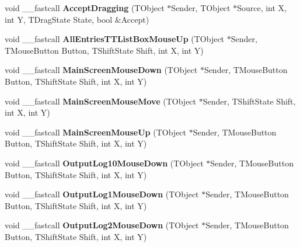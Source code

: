 \begin{DoxyCompactItemize}
void \+\_\+\+\_\+fastcall {\bfseries Accept\+Dragging} (T\+Object $\ast$Sender, T\+Object $\ast$Source, int X, int Y, T\+Drag\+State State, bool \&Accept)
\item 
\mbox{\label{class_t_interface_a189a4b05f27d6b5ec8b9a90ec1a9cc50}} 
void \+\_\+\+\_\+fastcall {\bfseries All\+Entries\+T\+T\+List\+Box\+Mouse\+Up} (T\+Object $\ast$Sender, T\+Mouse\+Button Button, T\+Shift\+State Shift, int X, int Y)
\item 
\mbox{\label{class_t_interface_a7f37862fb9e01e1328d9fd3fd8c50094}} 
void \+\_\+\+\_\+fastcall {\bfseries Main\+Screen\+Mouse\+Down} (T\+Object $\ast$Sender, T\+Mouse\+Button Button, T\+Shift\+State Shift, int X, int Y)
\item 
\mbox{\label{class_t_interface_abb268a3a209bc0d66111540c84345c1b}} 
void \+\_\+\+\_\+fastcall {\bfseries Main\+Screen\+Mouse\+Move} (T\+Object $\ast$Sender, T\+Shift\+State Shift, int X, int Y)
\item 
\mbox{\label{class_t_interface_a03280ee86df28a9a7cf4473cdf7b9f8b}} 
void \+\_\+\+\_\+fastcall {\bfseries Main\+Screen\+Mouse\+Up} (T\+Object $\ast$Sender, T\+Mouse\+Button Button, T\+Shift\+State Shift, int X, int Y)
\item 
\mbox{\label{class_t_interface_a32a17f1f0612836659a33a2e078afaad}} 
void \+\_\+\+\_\+fastcall {\bfseries Output\+Log10\+Mouse\+Down} (T\+Object $\ast$Sender, T\+Mouse\+Button Button, T\+Shift\+State Shift, int X, int Y)
\item 
\mbox{\label{class_t_interface_a5570aabf46e5a22819020d6568076fc2}} 
void \+\_\+\+\_\+fastcall {\bfseries Output\+Log1\+Mouse\+Down} (T\+Object $\ast$Sender, T\+Mouse\+Button Button, T\+Shift\+State Shift, int X, int Y)
\item 
\mbox{\label{class_t_interface_a2851df85ed71a1b1dbd8baa4dc1a2073}} 
void \+\_\+\+\_\+fastcall {\bfseries Output\+Log2\+Mouse\+Down} (T\+Object $\ast$Sender, T\+Mouse\+Button Button, T\+Shift\+State Shift, int X, int Y)
\item 
\mbox{\label{class_t_interface_ae66cf19e40646ae18b79c3cf9c1842a0}} 

\end{DoxyCompactItemize}
